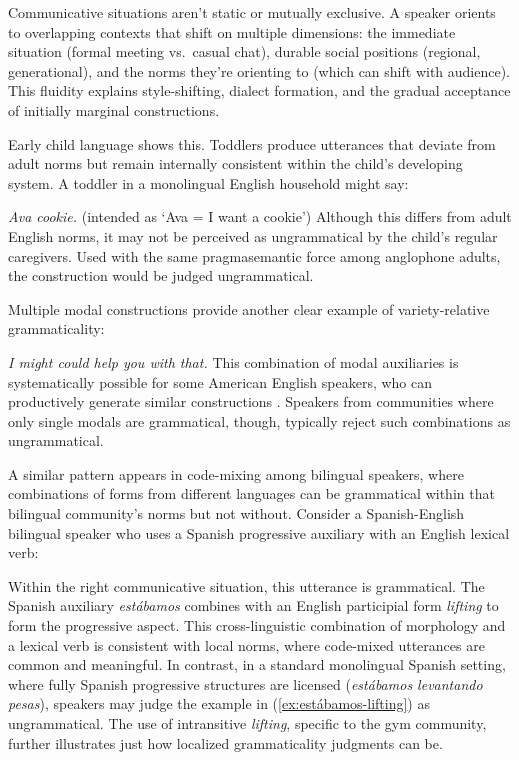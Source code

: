 \documentclass[12pt,letterpaper]{article}
\newcommand{\mention}[1]{\textit{#1}}
\newcommand{\olang}[1]{\textit{#1}}
\begin{document}
Communicative situations aren't static or mutually exclusive. A speaker orients to overlapping contexts that shift on multiple dimensions: the immediate situation (formal meeting vs.\ casual chat), durable social positions (regional, generational), and the norms they're orienting to (which can shift with audience). This fluidity explains style-shifting, dialect formation, and the gradual acceptance of initially marginal constructions.

Early child language shows this. Toddlers produce utterances that deviate from adult norms but remain internally consistent within the child's developing system. A toddler in a monolingual English household might say:

\ea
\mention{Ava cookie.} (intended as `Ava = I want a cookie')
\z
Although this differs from adult English norms, it may not be perceived as ungrammatical by the child's regular caregivers. Used with the same pragmasemantic force among anglophone adults, the construction would be judged ungrammatical.

Multiple modal constructions provide another clear example of variety-relative grammaticality:

\ea
\mention{I might could help you with that.}
\z
This combination of modal auxiliaries is systematically possible for some American English speakers, who can productively generate similar constructions \autocite{morin2024semantics}. Speakers from communities where only single modals are grammatical, though, typically reject such combinations as ungrammatical.

A similar pattern appears in code-mixing among bilingual speakers, where combinations of forms from different languages can be grammatical within that bilingual community's norms but not without. Consider a Spanish-English bilingual speaker who uses a Spanish progressive auxiliary with an English lexical verb:

 \label{ex:estábamos-lifting}
\z
Within the right communicative situation, this utterance is grammatical. The Spanish auxiliary \olang{estábamos} combines with an English participial form \mention{lifting} to form the progressive aspect. This cross-linguistic combination of morphology and a lexical verb is consistent with local norms, where code-mixed utterances are common and meaningful. In contrast, in a standard monolingual Spanish setting, where fully Spanish progressive structures are licensed (\olang{estábamos levantando pesas}), speakers may judge the example in (\ref{ex:estábamos-lifting}) as ungrammatical. The use of intransitive \mention{lifting}, specific to the gym community, further illustrates just how localized grammaticality judgments can be.
\end{document}
